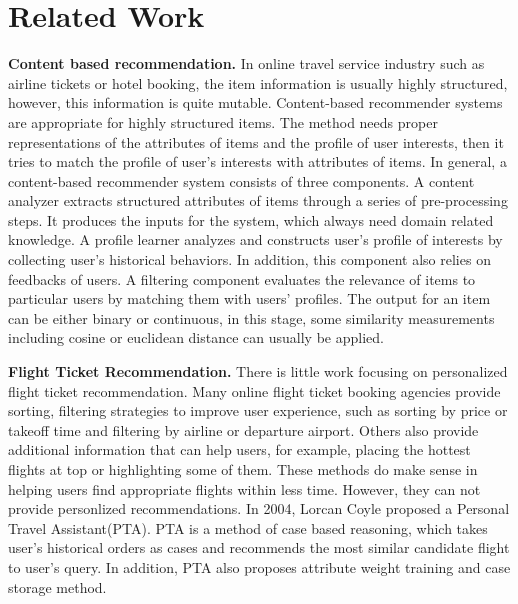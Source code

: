 \documentclass{llncs}
\begin{document}
\section{Related Work}
\label{sec:relw}
\textbf{Content based recommendation.} In online travel service industry such as airline tickets or hotel booking, the item information is usually highly structured, however, this information is quite mutable. Content-based recommender systems \cite{tech:cset}\cite{lops:handbook}are appropriate for highly structured items. The method needs proper representations of the attributes of items and the profile of user interests, then it tries to match  the profile of user's interests with attributes of items. In general, a content-based recommender system consists of three components. A content analyzer extracts structured attributes of items through a series of pre-processing steps. It produces the inputs for the system, which always need domain related knowledge. A profile learner analyzes and constructs user's profile of interests by collecting user's historical behaviors. In addition, this component also relies on feedbacks of users. A filtering component evaluates the relevance of items to particular users by matching them with users' profiles. The output for an item can be either binary or continuous, in this stage, some similarity measurements including cosine or euclidean distance can usually be applied.\par
\textbf{Flight Ticket Recommendation.} There is little work focusing on personalized flight ticket recommendation. Many online flight ticket booking agencies provide sorting, filtering strategies to improve user experience, such as sorting by price or takeoff time and filtering by airline or departure airport. Others also provide additional information that can help users, for example, placing the hottest flights at top or highlighting some of them. These methods do make sense in helping users find appropriate flights within less time. However, they can not provide personlized recommendations. In 2004, Lorcan Coyle\cite{lor:flight} proposed a Personal Travel Assistant(PTA). PTA is a method of case based reasoning, which takes user's historical orders as cases and recommends the most similar candidate flight to user's query. In addition, PTA also proposes attribute weight training and case storage method.\par
\end{document}
